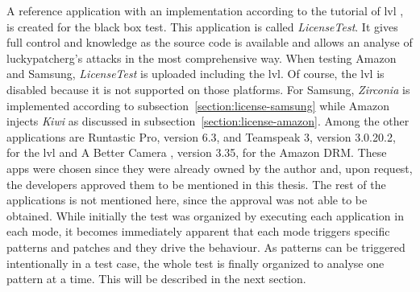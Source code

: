 \newline
A reference application with an implementation according to the tutorial of \gls{lvl} \cite{developersLicensingAdding}, is created for the black box test.
This application is called \textit{LicenseTest}.
It gives full control and knowledge as the source code is available and allows an analyse of \gls{luckypatcherg}’s attacks in the most comprehensive way.
When testing Amazon and Samsung, \textit{LicenseTest} is uploaded including the \gls{lvl}.
Of course,  the \gls{lvl} is disabled because it is not supported on those platforms.
For Samsung, \textit{Zirconia} is implemented according to subsection~\ref{section:license-samsung} while Amazon injects \textit{Kiwi} as discussed in subsection~\ref{section:license-amazon}.
Among the other applications are Runtastic Pro\cite{runtasticApp}, version 6.3, and Teamspeak 3\cite{teamspeakApp}, version 3.0.20.2, for the \gls{lvl} and A Better Camera \cite{abettercamera}, version 3.35, for the Amazon DRM.
These apps were chosen since they were already owned by the author and, upon request, the developers approved them to be mentioned in this thesis.
The rest of the applications is not mentioned here, since the approval was not able to be obtained.
\newline
While initially the test was organized by executing each application in each mode, it becomes immediately apparent that each mode triggers specific patterns and patches and they drive the behaviour.
As patterns can be triggered intentionally in a test case, the whole test is finally organized to analyse one pattern at a time.
This will be described in the next section.
